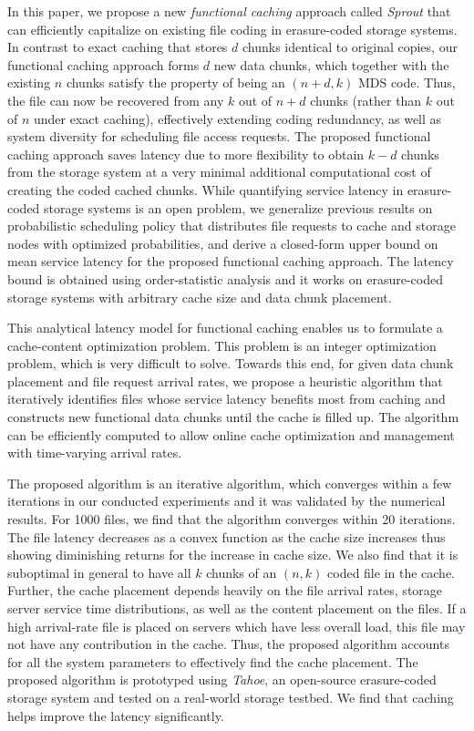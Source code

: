 In this paper, we propose a new {\em functional caching} approach called \textit{Sprout} that can efficiently capitalize on existing file coding in erasure-coded storage systems. In contrast to exact caching that stores $d$ chunks identical to original copies, our functional caching approach forms $d$ new data chunks, which together with the existing $n$ chunks satisfy the property of being an $(n+d,k)$ MDS code. Thus, the file can now be recovered from any $k$ out of $n+d$ chunks (rather than $k$ out of $n$ under exact caching), effectively extending coding redundancy, as well as system diversity for scheduling file access requests. The proposed functional caching approach saves latency due to more flexibility to obtain $k-d$ chunks from the storage system at a very minimal additional computational cost of creating the coded cached chunks. While quantifying service latency in erasure-coded storage systems is an open problem, we generalize previous results on probabilistic scheduling policy \cite{Yu_TON,Xiang:2014:Sigmetrics:2014} that distributes file requests to cache and storage nodes with optimized probabilities, and derive a closed-form upper bound on mean service latency for the proposed functional caching approach. The latency bound is obtained using order-statistic \cite{td_os} analysis and it works on erasure-coded storage systems with arbitrary cache size and data chunk placement. 

This analytical latency model for functional caching enables us to formulate a cache-content optimization problem. This problem is  an integer optimization problem, which is very difficult to solve. Towards this end, for given data chunk placement and file request arrival rates, we propose a heuristic algorithm that iteratively identifies files whose service latency benefits most from caching and constructs new functional data chunks until the cache is filled up. The algorithm can be efficiently computed to allow online cache optimization and management with time-varying arrival rates.

The proposed algorithm is an iterative algorithm, which converges within a few iterations in our conducted experiments and it was validated by the numerical results. For 1000 files, we find that the algorithm converges within 20 iterations. The file latency decreases as a convex function as the cache size increases thus showing diminishing returns for the increase in cache size. We also find that it is suboptimal in general to have all $k$ chunks of an $(n,k)$ coded file in the cache. Further, the cache placement depends heavily on the file arrival rates, storage server service time distributions, as well as the content placement on the files. If a high arrival-rate file is placed on servers which have less overall load, this file may not have any contribution in the cache. Thus, the proposed algorithm accounts for all the system parameters to effectively find the cache placement. The proposed algorithm is  prototyped using {\em Tahoe}, an open-source erasure-coded storage system \cite{tahoe} and tested on a real-world storage testbed. We find that caching helps improve the latency significantly.

